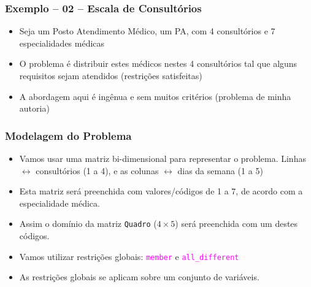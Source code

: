 \documentclass{beamer}
\begin{document}
\begin{frame}[fragile] 

\frametitle{Exemplo -- 02 -- Escala de Consultórios}



\begin{itemize}
\item Seja um Posto Atendimento Médico, um PA, com 4 consultórios e 7 especialidades
  médicas


\item O problema é distribuir estes médicos nestes 4 consultórios
tal que alguns requisitos sejam atendidos (restrições  satisfeitas)

\item A abordagem aqui é ingênua e sem muitos critérios (problema de minha autoria)
\end{itemize}

\end{frame}

\begin{frame}[fragile] 

\frametitle{Modelagem do Problema}

\begin{itemize}
  \item  Vamos usar uma matriz bi-dimensional para 
  representar o problema. Linhas $\leftrightarrow$ consultórios (1 a 4), e 
  as colunas $\leftrightarrow$ dias da semana (1 a 5)

  
  \item Esta matriz será preenchida com valores/códigos de 1 a 7, de acordo com a especialidade médica.
  
  
  \item Assim o domínio da matriz \texttt{Quadro} ($4 \times 5$) será   preenchida com um destes códigos.
   
  
  \item Vamos utilizar restrições globais: \textcolor{magenta}{\texttt{member}} e 
  \textcolor{magenta}{\texttt{all\_different}}

   \item As restrições globais se aplicam sobre um conjunto de variáveis.

\end{itemize}

\end{frame}
\end{document}
